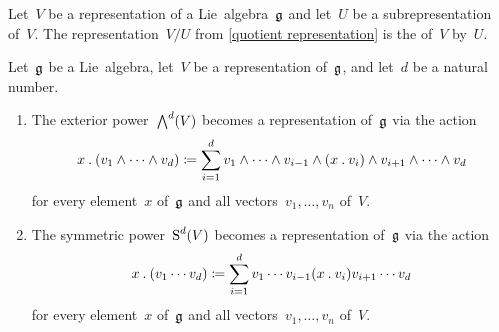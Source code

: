 \begin{definition}
  Let~$V$ be a representation of a Lie~algebra~$\mathfrak{g}$ and let~$U$ be a subrepresentation of~$V$.
  The representation~$V/U$ from \cref{quotient representation} is the  of~$V$ by~$U$.
\end{definition}


\begin{lemma}
  Let~$\mathfrak{g}$ be a Lie~algebra, let~$V$ be a representation of~$\mathfrak{g}$, and let~$d$ be a natural number.
  \begin{enumerate}
    \item
      The exterior power~$\operatorname{\bigwedge}^d(V)$ becomes a representation of~$\mathfrak{g}$ via the action
      \[
        x \mathbin{.} (v_1 \wedge \dotsb \wedge v_d)
        \coloneqq
        \sum_{i=1}^d
        v_1 \wedge \dotsb \wedge v_{i-1} \wedge (x \mathbin{.} v_i) \wedge v_{i+1} \wedge \dotsb \wedge v_d
      \]
      for every element~$x$ of~$\mathfrak{g}$ and all vectors~$v_1, \dotsc, v_n$ of~$V$.
    \item
      The symmetric power~$\operatorname{S}^d(V)$ becomes a representation of~$\mathfrak{g}$ via the action
      \[
        x \mathbin{.} (v_1 \dotsm v_d)
        \coloneqq
        \sum_{i=1}^d
        v_1 \dotsm v_{i-1} (x \mathbin{.} v_i) v_{i+1} \dotsm v_d
      \]
      for every element~$x$ of~$\mathfrak{g}$ and all vectors~$v_1, \dotsc, v_n$ of~$V$.
  \end{enumerate}
\end{lemma}


